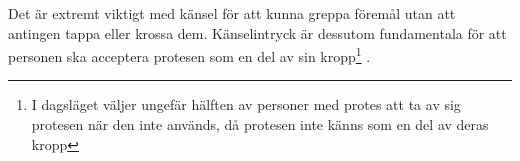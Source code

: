 \documentclass[12pt, a4paper]{article}
\begin{document}

Det är extremt viktigt med känsel för att kunna greppa föremål utan att antingen tappa eller krossa dem. Känselintryck är dessutom fundamentala för att personen ska acceptera protesen som en del av sin kropp\footnote{I dagsläget väljer ungefär hälften av personer med protes att ta av sig protesen när den inte används, då protesen inte känns som en del av deras kropp} \cite{prosthetic_operation}.

%
%
%
%
%
%
%


%
%
%
%


%
%
\end{document}

